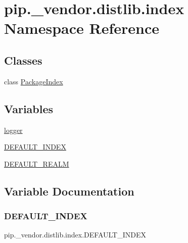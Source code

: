 \hypertarget{namespacepip_1_1__vendor_1_1distlib_1_1index}{}\section{pip.\+\_\+vendor.\+distlib.\+index Namespace Reference}
\label{namespacepip_1_1__vendor_1_1distlib_1_1index}
\subsection*{Classes}
\begin{DoxyCompactItemize}
\item 
class \hyperlink{classpip_1_1__vendor_1_1distlib_1_1index_1_1PackageIndex}{Package\+Index}
\end{DoxyCompactItemize}
\subsection*{Variables}
\begin{DoxyCompactItemize}
\item 
\hyperlink{namespacepip_1_1__vendor_1_1distlib_1_1index_a675d1e64aef89da544cc16090813d910}{logger}
\item 
\hyperlink{namespacepip_1_1__vendor_1_1distlib_1_1index_ae123e2c04244d5949a60295921c2fc4f}{D\+E\+F\+A\+U\+L\+T\+\_\+\+I\+N\+D\+EX}
\item 
\hyperlink{namespacepip_1_1__vendor_1_1distlib_1_1index_a3d2e3f419be64d7935e8aed2e02eecbe}{D\+E\+F\+A\+U\+L\+T\+\_\+\+R\+E\+A\+LM}
\end{DoxyCompactItemize}


\subsection{Variable Documentation}
\mbox{\label{namespacepip_1_1__vendor_1_1distlib_1_1index_ae123e2c04244d5949a60295921c2fc4f}} 
\subsubsection{\texorpdfstring{D\+E\+F\+A\+U\+L\+T\+\_\+\+I\+N\+D\+EX}{DEFAULT\_INDEX}}
{\footnotesize\ttfamily pip.\+\_\+vendor.\+distlib.\+index.\+D\+E\+F\+A\+U\+L\+T\+\_\+\+I\+N\+D\+EX}

